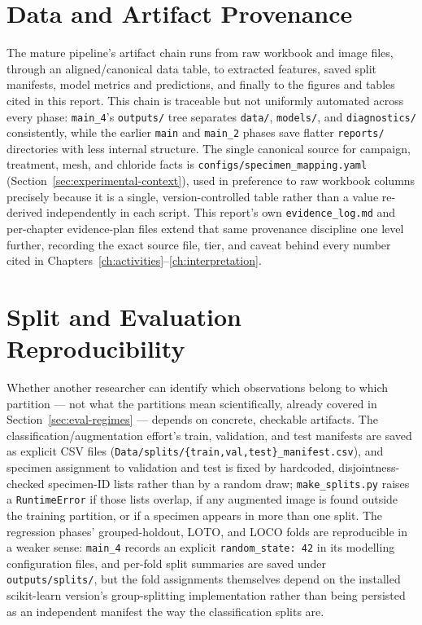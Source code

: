 \section{Data and Artifact Provenance}
\label{sec:eng-provenance}

The mature pipeline's artifact chain runs from raw workbook and image
files, through an aligned/canonical data table, to extracted features,
saved split manifests, model metrics and predictions, and finally to the
figures and tables cited in this report. This chain is traceable but not
uniformly automated across every phase: \texttt{main\_4}'s
\texttt{outputs/} tree separates \texttt{data/}, \texttt{models/}, and
\texttt{diagnostics/} consistently, while the earlier \texttt{main} and
\texttt{main\_2} phases save flatter \texttt{reports/} directories with
less internal structure. The single canonical source for campaign,
treatment, mesh, and chloride facts is \texttt{configs/specimen\_mapping.yaml}
(Section~\ref{sec:experimental-context}), used in preference to raw
workbook columns precisely because it is a single, version-controlled
table rather than a value re-derived independently in each script. This
report's own \texttt{evidence\_log.md} and per-chapter evidence-plan files
extend that same provenance discipline one level further, recording the
exact source file, tier, and caveat behind every number cited in
Chapters~\ref{ch:activities}--\ref{ch:interpretation}.

\section{Split and Evaluation Reproducibility}
\label{sec:eng-splits}

Whether another researcher can identify which observations belong to which
partition — not what the partitions mean scientifically, already covered
in Section~\ref{sec:eval-regimes} — depends on concrete, checkable
artifacts. The classification/augmentation effort's train, validation, and
test manifests are saved as explicit CSV files
(\texttt{Data/splits/\{train,val,test\}\_manifest.csv}), and specimen
assignment to validation and test is fixed by hardcoded, disjointness-checked
specimen-ID lists rather than by a random draw; \texttt{make\_splits.py}
raises a \texttt{RuntimeError} if those lists overlap, if any augmented
image is found outside the training partition, or if a specimen appears in
more than one split. The regression phases' grouped-holdout, LOTO, and
LOCO folds are reproducible in a weaker sense: \texttt{main\_4} records an
explicit \texttt{random\_state: 42} in its modelling configuration files,
and per-fold split summaries are saved under \texttt{outputs/splits/}, but
the fold assignments themselves depend on the installed scikit-learn
version's group-splitting implementation rather than being persisted as an
independent manifest the way the classification splits are.

